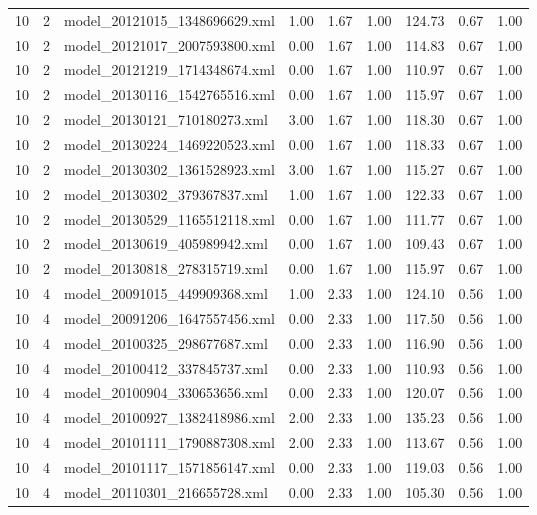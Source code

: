 \begin{table}[ht]
\begin{tabular}{rrlrrrrrr}
   10 &   2 & model\_20121015\_1348696629.xml & 1.00 & 1.67 & 1.00 & 124.73 & 0.67 & 1.00 \\ 
   10 &   2 & model\_20121017\_2007593800.xml & 0.00 & 1.67 & 1.00 & 114.83 & 0.67 & 1.00 \\ 
   10 &   2 & model\_20121219\_1714348674.xml & 0.00 & 1.67 & 1.00 & 110.97 & 0.67 & 1.00 \\ 
   10 &   2 & model\_20130116\_1542765516.xml & 0.00 & 1.67 & 1.00 & 115.97 & 0.67 & 1.00 \\ 
   10 &   2 & model\_20130121\_710180273.xml & 3.00 & 1.67 & 1.00 & 118.30 & 0.67 & 1.00 \\ 
   10 &   2 & model\_20130224\_1469220523.xml & 0.00 & 1.67 & 1.00 & 118.33 & 0.67 & 1.00 \\ 
   10 &   2 & model\_20130302\_1361528923.xml & 3.00 & 1.67 & 1.00 & 115.27 & 0.67 & 1.00 \\ 
   10 &   2 & model\_20130302\_379367837.xml & 1.00 & 1.67 & 1.00 & 122.33 & 0.67 & 1.00 \\ 
   10 &   2 & model\_20130529\_1165512118.xml & 0.00 & 1.67 & 1.00 & 111.77 & 0.67 & 1.00 \\ 
   10 &   2 & model\_20130619\_405989942.xml & 0.00 & 1.67 & 1.00 & 109.43 & 0.67 & 1.00 \\ 
   10 &   2 & model\_20130818\_278315719.xml & 0.00 & 1.67 & 1.00 & 115.97 & 0.67 & 1.00 \\ 
   10 &   4 & model\_20091015\_449909368.xml & 1.00 & 2.33 & 1.00 & 124.10 & 0.56 & 1.00 \\ 
   10 &   4 & model\_20091206\_1647557456.xml & 0.00 & 2.33 & 1.00 & 117.50 & 0.56 & 1.00 \\ 
   10 &   4 & model\_20100325\_298677687.xml & 0.00 & 2.33 & 1.00 & 116.90 & 0.56 & 1.00 \\ 
   10 &   4 & model\_20100412\_337845737.xml & 0.00 & 2.33 & 1.00 & 110.93 & 0.56 & 1.00 \\ 
   10 &   4 & model\_20100904\_330653656.xml & 0.00 & 2.33 & 1.00 & 120.07 & 0.56 & 1.00 \\ 
   10 &   4 & model\_20100927\_1382418986.xml & 2.00 & 2.33 & 1.00 & 135.23 & 0.56 & 1.00 \\ 
   10 &   4 & model\_20101111\_1790887308.xml & 2.00 & 2.33 & 1.00 & 113.67 & 0.56 & 1.00 \\ 
   10 &   4 & model\_20101117\_1571856147.xml & 0.00 & 2.33 & 1.00 & 119.03 & 0.56 & 1.00 \\ 
   10 &   4 & model\_20110301\_216655728.xml & 0.00 & 2.33 & 1.00 & 105.30 & 0.56 & 1.00 \\ 

\end{tabular}
\end{table}
